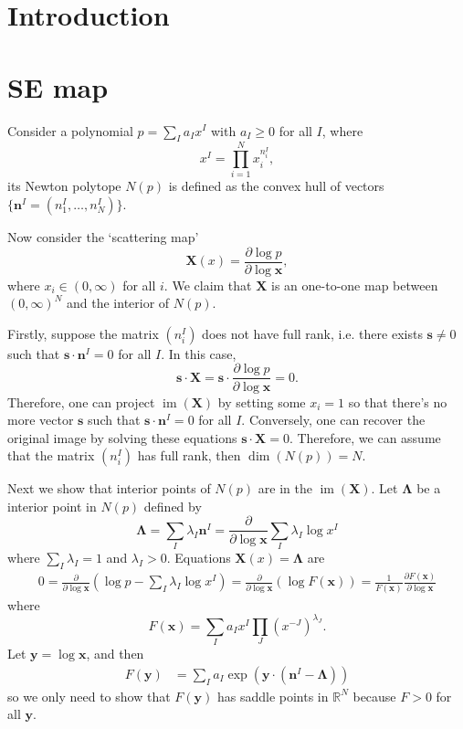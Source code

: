 \documentclass[12pt]{article}
\theoremstyle{definition}
\theoremstyle{plain}
\begin{document}
\section{Introduction}
\section{SE map}

Consider a polynomial $p=\sum_{I} a_I x^I$ with $a_I\geq 0$ for all $I$, where 
\[
	x^I=\prod_{i=1}^N x_i^{n^I_i},
\]
its Newton polytope $N(p)$ is defined as the convex hull of vectors $\{\mathbf{n}^I=(n^I_1,\dots,n^I_N)\}$.

Now consider the `scattering map' 
\[
	\mathbf X(x)=\frac{\partial \log p}{\partial \log \mathbf x},
\]
where $x_i\in (0,\infty)$ for all $i$. We claim that $\mathbf{X}$ is an one-to-one map between $(0,\infty)^N$ and the interior of $N(p)$. 

Firstly, suppose the matrix $(n_i^I)$ does not have full rank, i.e. there exists $\mathbf s\neq 0$ such that $\mathbf s \cdot \mathbf n^I=0$ for all $I$. In this case,
\[
	\mathbf s\cdot\mathbf X=\mathbf s\cdot\frac{\partial \log p}{\partial \log \mathbf x}=0.
\]
Therefore, one can project $\operatorname{im}(\mathbf X)$ by setting some $x_i=1$ so that there's no more vector $\mathbf s$ such that $\mathbf s\cdot \mathbf n^I=0$ for all $I$. Conversely, one can recover the original image by solving these equations $\mathbf s\cdot\mathbf X=0$. Therefore, we can assume that the matrix $(n_i^I)$ has full rank, then $\dim (N(p))=N$.

Next we show that interior points of $N(p)$ are in the $\operatorname{im}(\mathbf{X})$.
Let $\mathbf{\Lambda}$ be a interior point in $N(p)$ defined by 
\[
	\mathbf \Lambda=\sum_{I}\lambda_I\mathbf n^I
	=\frac{\partial}{\partial \log \mathbf x}\sum_{I}\lambda_I \log x^I
\]
where $\sum_I \lambda_I=1$ and $\lambda_I > 0$. Equations $\mathbf X(x)=\mathbf \Lambda$ are 
\[
\begin{aligned}
	0=\frac{\partial }{\partial \log \mathbf x}\left(
	\log p-\sum_{I}\lambda_I \log x^I
	\right)=\frac{\partial }{\partial \log \mathbf x}\left(
	\log F(\mathbf x)
	\right)=\frac{1}{F(\mathbf x)}\frac{\partial F(\mathbf x)}{\partial \log \mathbf x}
\end{aligned}
\]
where
\[
	F(\mathbf x)=\sum_I a_I x^I\prod_J (x^{-J})^{\lambda_J}.
\]
Let $\mathbf y=\log \mathbf x$, and then
\[
	\begin{aligned}
		F(\mathbf y)
		&=\sum_I a_I \exp\left(\mathbf{y}\cdot \left(\mathbf{n}^I-\mathbf{\Lambda}\right)\right)
	\end{aligned}
\]
so we only need to show that $F(\mathbf y)$ has saddle points in $\mathbb R^N$ because $F>0$ for all $\mathbf y$.
\end{document}
